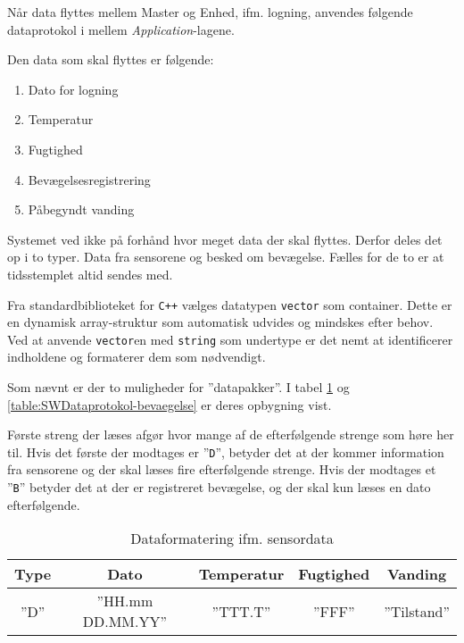 
Når data flyttes mellem Master og Enhed, ifm. logning, anvendes følgende dataprotokol i mellem \textit{Application}-lagene.

Den data som skal flyttes er følgende:

\begin{enumerate}
	\item Dato for logning
	\item Temperatur
	\item Fugtighed
	\item Bevægelsesregistrering
	\item Påbegyndt vanding
\end{enumerate}

Systemet ved ikke på forhånd hvor meget data der skal flyttes. Derfor deles det op i to typer. Data fra sensorene og besked om bevægelse.
Fælles for de to er at tidsstemplet altid sendes med.

Fra standardbiblioteket for \verb'C++' vælges datatypen \verb+vector+ som container. Dette er en dynamisk array-struktur som automatisk udvides og mindskes efter behov.
Ved at anvende \verb+vector+en med \verb+string+ som undertype er det nemt at identificerer indholdene og formaterer dem som nødvendigt.

Som nævnt er der to muligheder for ''datapakker''. I tabel \ref{table:SWDataprotokol-sensor} og \ref{table:SWDataprotokol-bevaegelse} er deres opbygning vist.

Første streng der læses afgør hvor mange af de efterfølgende strenge som høre her til. Hvis det første der modtages er ''\verb+D+'', betyder det at der kommer information fra sensorene og der skal læses fire efterfølgende strenge.
Hvis der modtages et ''\verb+B+'' betyder det at der er registreret bevægelse, og der skal kun læses en dato efterfølgende.

\begin{table}[h]
	\caption{Dataformatering ifm. sensordata}
	\centering
	\begin{tabular}{|c|c|c|c|c|}
		\hline 
		\textbf{Type} & \textbf{Dato} & \textbf{Temperatur} & \textbf{Fugtighed} & \textbf{Vanding} \\ 
		\hline 
		''D'' & ''HH.mm DD.MM.YY'' & ''TTT.T'' & ''FFF'' & ''Tilstand'' \\ 
		\hline 
	\end{tabular} 
	\label{table:SWDataprotokol-sensor}
\end{table}

